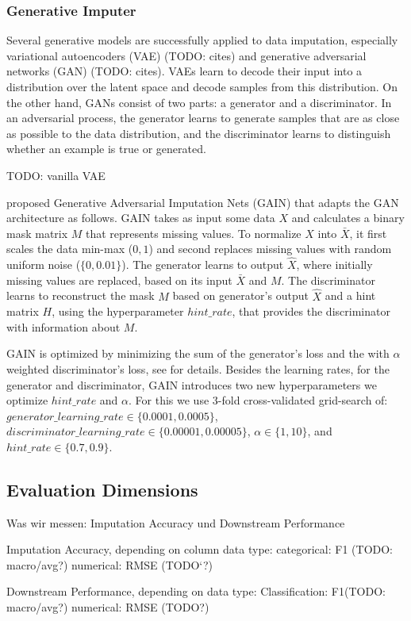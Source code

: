 \subsubsection{Generative Imputer}
%
Several generative models are successfully applied to data imputation, especially variational autoencoders (VAE) (TODO: cites) and generative adversarial networks (GAN) (TODO: cites). VAEs learn to decode their input into a distribution over the latent space and decode samples from this distribution. On the other hand, GANs consist of two parts: a generator and a discriminator. In an adversarial process, the generator learns to generate samples that are as close as possible to the data distribution, and the discriminator learns to distinguish whether an example is true or generated.

TODO: vanilla VAE

\cite{GAIN} proposed Generative Adversarial Imputation Nets (GAIN) that adapts the GAN architecture as follows. GAIN takes as input some data $X$ and calculates a binary mask matrix $M$ that represents missing values. To normalize $X$ into $\bar{X}$, it first scales the data min-max ($0, 1$) and second replaces missing values with random uniform noise ($\{0, 0.01\}$). The generator learns to output $\hat{X}$, where initially missing values are replaced, based on its input $\bar{X}$ and $M$. The discriminator learns to reconstruct the mask $M$ based on generator's output $\hat{X}$ and a hint matrix $H$, using the hyperparameter $hint\_rate$, that provides the discriminator with information about $M$.

GAIN is optimized by minimizing the sum of the generator's loss and the with $\alpha$ weighted discriminator's loss, see \cite{GAIN} for details. Besides the learning rates, for the generator and discriminator, GAIN introduces two new hyperparameters we optimize $hint\_rate$ and $\alpha$. For this we use 3-fold cross-validated grid-search of: $generator\_learning\_rate \in \{0.0001, 0.0005\}$, $discriminator\_learning\_rate \in \{0.00001, 0.00005\}$, $\alpha \in \{1, 10\}$, and $hint\_rate \in \{0.7, 0.9\}$.


\subsection{Evaluation Dimensions}
%

Was wir messen:
Imputation Accuracy und Downstream Performance

Imputation Accuracy, depending on column data type:
categorical: F1 (TODO: macro/avg?)
numerical: RMSE (TODO`?)

Downstream Performance, depending on data type:
Classification: F1(TODO: macro/avg?)
numerical: RMSE (TODO?)
